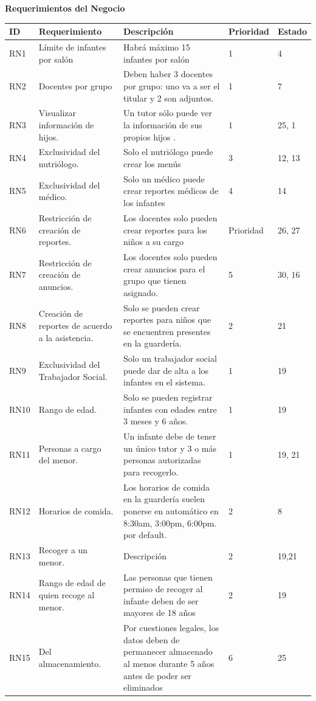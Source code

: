 \documentclass{article}
\begin{document}
\textbf{Requerimientos del Negocio} \\
	\begin{longtable}{|p{1.0cm}|p{3.0cm}|p{5.0cm}|p{1.2cm}|p{0.75cm}|}
	\hline
	\textbf{ID} & \textbf{Requerimiento} & \textbf{Descripción} & \textbf{Prioridad} & \textbf{Estado} \\
	\hline
	RN1 & Límite de infantes por salón & Habrá máximo 15 infantes por salón & 1 & 4 \\
	\hline
	RN2 & Docentes por grupo & Deben haber 3 docentes por grupo: uno va a ser el titular y 2 son adjuntos. & 1 & 7 \\
	\hline
	RN3 & Visualizar información de hijos. & Un tutor sólo puede ver la información de sus propios hijos . & 1 & 25, 1 \\
	\hline
	RN4 & Exclusividad del nutriólogo. & Solo el nutriólogo puede crear los menús & 3 & 12, 13 \\
	\hline
	RN5 & Exclusividad del médico.  & Solo un médico puede crear reportes médicos de los infantes & 4 & 14 \\
	\hline
	RN6 & Restricción de creación de reportes. & Los docentes solo pueden crear reportes para los niños a su cargo & Prioridad & 26, 27 \\
	\hline
	RN7 & Restricción de creación de anuncios. & Los docentes solo pueden crear anuncios para el grupo que tienen asignado. & 5 & 30, 16 \\
	\hline
	RN8 & Creación de reportes de acuerdo a la asistencia. & Solo se pueden crear reportes para niños que se encuentren presentes en la guardería. & 2 & 21 \\
	\hline
	RN9 & Exclusividad del Trabajador Social. & Solo un trabajador social puede dar de alta a los infantes en el sistema. & 1 & 19 \\
	\hline
	RN10 & Rango de edad. & Solo se pueden registrar infantes con edades entre 3 meses y 6 años. & 1 & 19 \\
	\hline
	RN11 & Personas a cargo del menor. & Un infante debe de tener un único tutor y 3 o más personas autorizadas para recogerlo. & 1 & 19, 21 \\
	\hline
	RN12 & Horarios de comida. & Los horarios de comida en la guardería suelen ponerse en automático en 8:30am, 3:00pm, 6:00pm. por default. & 2 & 8 \\
	\hline
	RN13 & Recoger a un menor.  & Descripción & 2 & 19,21 \\
	\hline
	RN14 & Rango de edad de quien recoge al menor. & Las personas que tienen permiso de recoger al infante deben de ser mayores de 18 años  & 2 & 19 \\
	\hline
	RN15 & Del almacenamiento. & Por cuestiones legales, los datos deben de permanecer almacenado al menos durante 5 años antes de poder ser eliminados & 6 & 25 \\
	\hline
	\end{longtable}
\end{document}
